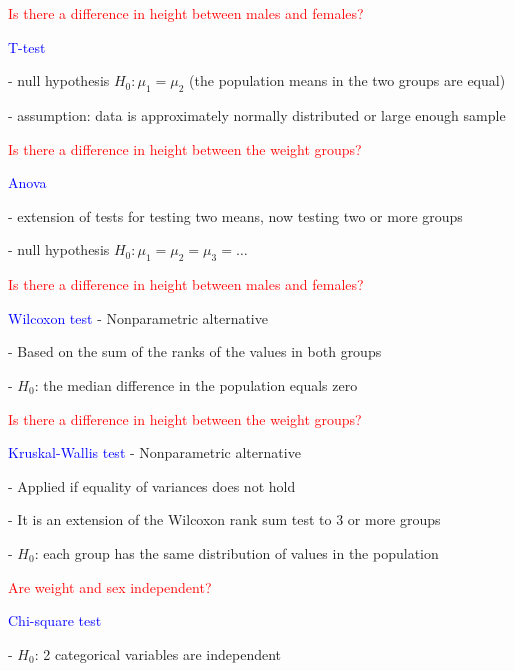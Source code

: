 \documentclass{presentatiesmetlogo}
\begin{document}
\bitem
\item \textcolor{red}{Is there a difference in height between males and females?}
\bitemt
\item \textcolor{blue}{T-test}
\bitemt
\item[-] null hypothesis $H_0 : \mu_1 = \mu_2$ (the population means in the two groups are equal)
\item[-] assumption: data is approximately normally distributed or large enough sample
\eitemt
\eitemt
\item \textcolor{red}{Is there a difference in height between the weight groups?}
\bitemt
\item \textcolor{blue}{Anova}
\bitemt
\item[-] extension of tests for testing two means, now testing two or more groups
\item[-] null hypothesis $H_0 : \mu_1 = \mu_2 = \mu_3 = \dots$
\eitemt
\eitemt
\eitem
\bitem
\item \textcolor{red}{Is there a difference in height between males and females?}
\bitemt
\item \textcolor{blue}{Wilcoxon test} -  Nonparametric alternative
\bitemt
\item[-] Based on the sum of the ranks of the values in both groups
\item[-] $H_0$: the median difference in the population equals zero
\eitemt
\eitemt
\item \textcolor{red}{Is there a difference in height between the weight groups?}
\bitemt
\item \textcolor{blue}{Kruskal-Wallis test} -  Nonparametric alternative
\bitemt
\item[-] Applied if equality of variances does not hold
\item[-] It is an extension of the Wilcoxon rank sum test to 3 or more groups
\item[-] $H_0$: each group has the same distribution of values in the population
\eitemt
\eitemt
\eitem
\bitem
\item \textcolor{red}{Are weight and sex independent?}
\bitemt
\item \textcolor{blue}{Chi-square test}
\bitemt
\item[-] $H_0$: 2 categorical variables are independent
\end{document}
